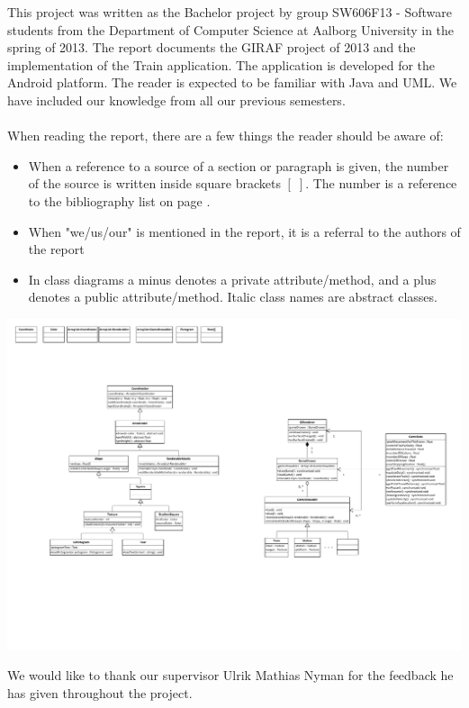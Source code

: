 This project was written as the Bachelor project by group SW606F13 - Software students from the Department of Computer Science at Aalborg University in the spring of 2013. The report documents the GIRAF project of 2013 and the implementation of the Train application. The application is developed for the Android platform. The reader is expected to be familiar with Java and UML. We have included our knowledge from all our previous semesters.
\\\\
When reading the report, there are a few things the reader should be aware of:
\begin{itemize}
\item When a reference to a source of a section or paragraph is given, the number of the source is written inside square brackets $[\;]$. The number is a reference to the bibliography list on page \pageref{chap:bib}.
\item When "we/us/our" is mentioned in the report, it is a referral to the authors of the report
\item In class diagrams a minus denotes a private attribute/method, and a plus denotes a public attribute/method. Italic class names are abstract classes.
\end{itemize}
\begin{center}
\includegraphics[page=4,width=0.7\linewidth]{img/opengl.pdf}
\end{center}
We would like to thank our supervisor Ulrik Mathias Nyman for the feedback he has given throughout the project.
